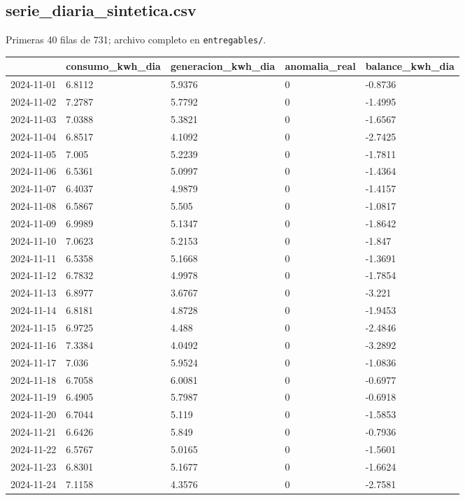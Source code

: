 \subsection*{serie\_diaria\_sintetica.csv}
{\footnotesize Primeras 40 filas de 731; archivo completo en \texttt{entregables/}.}\\
{\footnotesize\begin{longtable}{@{}lllll@{}}
\toprule
 & consumo\_kwh\_dia & generacion\_kwh\_dia & anomalia\_real & balance\_kwh\_dia \\
\midrule\endhead
2024-11-01 & 6.8112 & 5.9376 & 0 & -0.8736 \\
2024-11-02 & 7.2787 & 5.7792 & 0 & -1.4995 \\
2024-11-03 & 7.0388 & 5.3821 & 0 & -1.6567 \\
2024-11-04 & 6.8517 & 4.1092 & 0 & -2.7425 \\
2024-11-05 & 7.005 & 5.2239 & 0 & -1.7811 \\
2024-11-06 & 6.5361 & 5.0997 & 0 & -1.4364 \\
2024-11-07 & 6.4037 & 4.9879 & 0 & -1.4157 \\
2024-11-08 & 6.5867 & 5.505 & 0 & -1.0817 \\
2024-11-09 & 6.9989 & 5.1347 & 0 & -1.8642 \\
2024-11-10 & 7.0623 & 5.2153 & 0 & -1.847 \\
2024-11-11 & 6.5358 & 5.1668 & 0 & -1.3691 \\
2024-11-12 & 6.7832 & 4.9978 & 0 & -1.7854 \\
2024-11-13 & 6.8977 & 3.6767 & 0 & -3.221 \\
2024-11-14 & 6.8181 & 4.8728 & 0 & -1.9453 \\
2024-11-15 & 6.9725 & 4.488 & 0 & -2.4846 \\
2024-11-16 & 7.3384 & 4.0492 & 0 & -3.2892 \\
2024-11-17 & 7.036 & 5.9524 & 0 & -1.0836 \\
2024-11-18 & 6.7058 & 6.0081 & 0 & -0.6977 \\
2024-11-19 & 6.4905 & 5.7987 & 0 & -0.6918 \\
2024-11-20 & 6.7044 & 5.119 & 0 & -1.5853 \\
2024-11-21 & 6.6426 & 5.849 & 0 & -0.7936 \\
2024-11-22 & 6.5767 & 5.0165 & 0 & -1.5601 \\
2024-11-23 & 6.8301 & 5.1677 & 0 & -1.6624 \\
2024-11-24 & 7.1158 & 4.3576 & 0 & -2.7581 \\

\end{longtable}}
